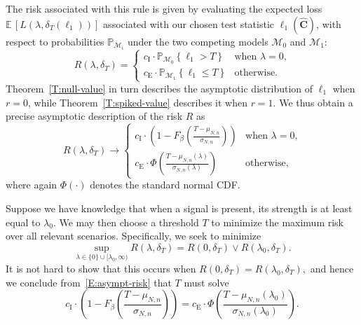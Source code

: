\documentclass[final]{IEEEtran}
\newcommand{\matrixsymbol}{\boldsymbol}
\newcommand{\mhC}{\widehat{\matrixsymbol{C}}}
\newcommand{\ulambda}{\lambda_0}
\newcommand{\ce}{c_\text{E}}
\newcommand{\ci}{c_\text{I}}
\newcommand{\E}{\mathbb{E}}
\newcommand{\Prob}{\mathbb{P}}
\begin{document}
The risk associated with this rule is given by evaluating the expected loss $\E \, [ L( \lambda, \delta_T( \ell_1 ) )]$ associated with our chosen test statistic $\ell_1(\mhC)$, with respect to probabilities $\Prob_{\mathcal{M}_i}$ under the two competing models $\mathcal{M}_0$ and $\mathcal{M}_1$:
\begin{equation*}
    R( \lambda, \delta_T )
         = \begin{cases}
               \ci \cdot \Prob_{\mathcal{M}_0} \! \left\{ \ell_1 > T \right\}
                   &\text{when $\lambda=0$,} \\
               \ce \! \cdot \Prob_{\mathcal{M}_1} \! \left\{ \ell_1 \leq T \right\}
                   &\text{otherwise.}
           \end{cases}
\end{equation*}
Theorem~\ref{T:null-value} in turn describes the asymptotic distribution of $\ell_1$ when
$r=0$, while Theorem~\ref{T:spiked-value} describes it when $r=1$.  We thus obtain a precise asymptotic description of the risk $R$ as
\begin{equation}\label{E:asympt-risk}
    R( \lambda, \delta_T )
    \to \begin{cases}
           \ci \cdot \left(1 - F_\beta \left( \frac{ T - \mu_{N,n} }
                                                   { \sigma_{N,n}} \right) \right)
               &\text{when $\lambda=0$,} \\
           \ce \cdot \Phi \left( \frac{T - \mu_{N,n} (\lambda)}
                                      { \sigma_{N,n} (\lambda)} \right)
               &\text{otherwise,}
       \end{cases}
\end{equation}
where again $\Phi( \cdot )$ denotes the standard normal CDF.

Suppose we have knowledge that when a signal is present, its strength is at least equal to $\ulambda$.  We may then choose a threshold $T$ to minimize the maximum risk over all relevant scenarios.  Specifically,
we seek to minimize
\begin{equation}\label{E:mm-risk}
    \sup_{\lambda \in \{ 0 \} \cup [\ulambda, \infty)}  \!\!\!\! R( \lambda, \delta_T )
    =
     R(0, \delta_T) \vee R(\ulambda, \delta_T)
    .
\end{equation}
It is not hard to show that this occurs when
\(
    R(0, \delta_T) = R(\ulambda, \delta_T),
\)
and hence we conclude from~\eqref{E:asympt-risk} that $T$ must solve
\begin{equation}\label{E:T-eqn}
    \textstyle
    \ci \cdot \left(1 - F_\beta \left( \frac{ T - \mu_{N,n} }
                                         { \sigma_{N,n}} \right) \!\right)
   \! =
    \ce \cdot \Phi \left( \frac{T - \mu_{N,n} (\ulambda)}
                            { \sigma_{N,n} (\ulambda)} \right) \!.
\end{equation}
\end{document}
